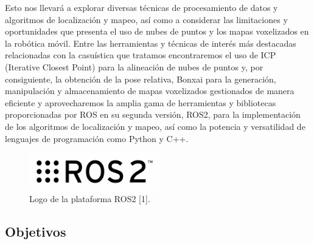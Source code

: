 \documentclass[12pt, a4paper, twoside]{article}
\begin{document}
Esto nos llevará a explorar diversas técnicas de procesamiento de datos y algoritmos de localización y mapeo, así como a 
considerar las limitaciones y oportunidades que presenta el uso de nubes de puntos y los mapas voxelizados en la 
robótica móvil. \newline
Entre las herramientas y técnicas de interés más destacadas relacionadas con la casuística que tratamos encontraremos 
el uso de ICP (Iterative Closest Point) para la alineación de nubes de puntos y, por consiguiente, la obtención de la pose relativa, 
Bonxai para la generación, manipulación y almacenamiento de mapas voxelizados gestionados de manera eficiente y aprovecharemos 
la amplia gama de herramientas y bibliotecas proporcionadas por ROS en su segunda versión, ROS2, para la implementación de los 
algoritmos de localización y mapeo, así como la potencia y versatilidad de lenguajes de programación como Python y C++. \newline

\begin{figure}[h]
  \centering
    \includegraphics[width=0.5\textwidth]{ROS2_logo.png}
  \caption{Logo de la plataforma ROS2 [1].}
\end{figure}

\subsection{Objetivos}
\end{document}
